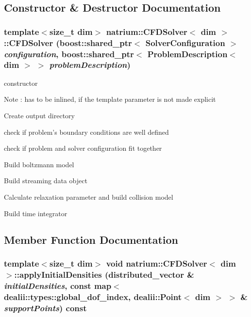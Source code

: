 \subsection{Constructor \& Destructor Documentation}
\hypertarget{classnatrium_1_1CFDSolver_a47ca594a73dc5ab04e319ba588cda3dd}{
\subsubsection[{CFDSolver}]{\setlength{\rightskip}{0pt plus 5cm}template$<$size\_\-t dim$>$ {\bf natrium::CFDSolver}$<$ dim $>$::{\bf CFDSolver} (boost::shared\_\-ptr$<$ {\bf SolverConfiguration} $>$ {\em configuration}, \/  boost::shared\_\-ptr$<$ {\bf ProblemDescription}$<$ dim $>$ $>$ {\em problemDescription})}}
\label{classnatrium_1_1CFDSolver_a47ca594a73dc5ab04e319ba588cda3dd}
constructor \begin{DoxyNote}{Note}
: has to be inlined, if the template parameter is not made explicit 
\end{DoxyNote}


Create output directory

check if problem's boundary conditions are well defined

check if problem and solver configuration fit together

Build boltzmann model

Build streaming data object

Calculate relaxation parameter and build collision model

Build time integrator 

\subsection{Member Function Documentation}
\hypertarget{classnatrium_1_1CFDSolver_a36146c0f8a6c5abd0ebec4c49f2a4e6d}{
\subsubsection[{applyInitialDensities}]{\setlength{\rightskip}{0pt plus 5cm}template$<$size\_\-t dim$>$ void {\bf natrium::CFDSolver}$<$ dim $>$::applyInitialDensities (distributed\_\-vector \& {\em initialDensities}, \/  const map$<$ dealii::types::global\_\-dof\_\-index, dealii::Point$<$ dim $>$ $>$ \& {\em supportPoints}) const}}
\label{classnatrium_1_1CFDSolver_a36146c0f8a6c5abd0ebec4c49f2a4e6d}


